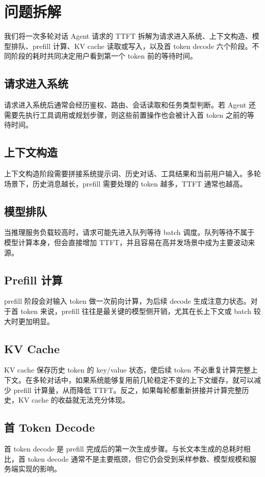 \section{问题拆解}

我们将一次多轮对话 Agent 请求的 TTFT 拆解为请求进入系统、上下文构造、模型排队、prefill 计算、KV cache 读取或写入，以及首 token decode 六个阶段。不同阶段的耗时共同决定用户看到第一个 token 前的等待时间。

\subsection{请求进入系统}

请求进入系统后通常会经历鉴权、路由、会话读取和任务类型判断。若 Agent 还需要先执行工具调用或规划步骤，则这些前置操作也会被计入首 token 之前的等待时间。

\subsection{上下文构造}

上下文构造阶段需要拼接系统提示词、历史对话、工具结果和当前用户输入。多轮场景下，历史消息越长，prefill 需要处理的 token 越多，TTFT 通常也越高。

\subsection{模型排队}

当推理服务负载较高时，请求可能先进入队列等待 batch 调度。队列等待不属于模型计算本身，但会直接增加 TTFT，并且容易在高并发场景中成为主要波动来源。

\subsection{Prefill 计算}

prefill 阶段会对输入 token 做一次前向计算，为后续 decode 生成注意力状态。对于首 token 来说，prefill 往往是最关键的模型侧开销，尤其在长上下文或 batch 较大时更加明显。

\subsection{KV Cache}

KV cache 保存历史 token 的 key/value 状态，使后续 token 不必重复计算完整上下文。在多轮对话中，如果系统能够复用前几轮稳定不变的上下文缓存，就可以减少 prefill 计算量，从而降低 TTFT。反之，如果每轮都重新拼接并计算完整历史，KV cache 的收益就无法充分体现。

\subsection{首 Token Decode}

首 token decode 是 prefill 完成后的第一次生成步骤。与长文本生成的总耗时相比，首 token decode 通常不是主要瓶颈，但它仍会受到采样参数、模型规模和服务端实现的影响。

